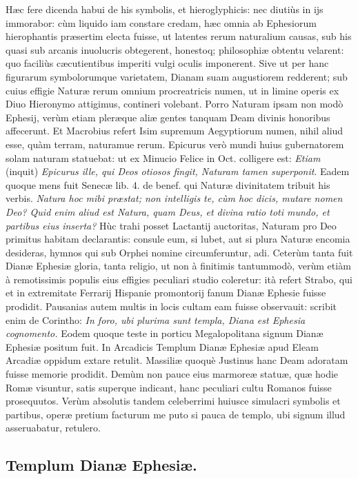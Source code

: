 \documentclass[a4paper, 11pt, oneside, polutonikogreek, latin]{article}
\begin{document}
Hæc fere dicenda habui de his symbolis, et hieroglyphicis: nec diutiùs in ijs immorabor: cùm liquido iam constare credam, hæc omnia ab Ephesiorum hierophantis præsertim electa fuisse, ut latentes rerum naturalium causas, sub his quasi sub arcanis inuolucris obtegerent, honestoq; philosophiæ obtentu velarent: quo faciliùs cæcutientibus imperiti vulgi oculis imponerent. Sive ut per hanc figurarum symbolorumque varietatem, Dianam suam augustiorem redderent; sub cuius effigie Naturæ rerum omnium procreatricis numen, ut in limine operis ex Diuo Hieronymo attigimus, contineri volebant. Porro Naturam ipsam non modò Ephesij, verùm etiam pleræque aliæ gentes tanquam Deam divinis honoribus affecerunt. Et Macrobius refert Isim supremum Aegyptiorum numen, nihil aliud esse, quàm terram, naturamue rerum. Epicurus verò mundi huius gubernatorem solam naturam statuebat: ut ex Minucio Felice in Oct. colligere est: \emph{Etiam} (inquit) \emph{Epicurus ille, qui Deos otiosos fingit, Naturam tamen superponit}. Eadem quoque mens fuit Senecæ lib. 4. de benef. qui Naturæ divinitatem tribuit his verbis. \emph{Natura hoc mibi præstat; non intelligis te, cùm hoc dicis, mutare nomen Deo? Quid enim aliud est Natura, quam Deus, et divina ratio toti mundo, et partibus eius inserta?} Hùc trahi posset Lactantij auctoritas, Naturam pro Deo primitus habitam declarantis: consule eum, si lubet, aut si plura Naturæ encomia desideras, hymnos qui sub Orphei nomine circumferuntur, adi. Ceterùm tanta fuit Dianæ Ephesiæ gloria, tanta religio, ut non à finitimis tantummodò, verùm etiàm à remotissimis populis eius effigies peculiari studio coleretur: ità refert Strabo, qui et in extremitate Ferrarij Hispanie promontorij fanum Dianæ Ephesie fuisse prodidit. Pausanias autem multis in locis cultam eam fuisse observauit: scribit enim de Corintho: \emph{In foro, ubi plurima sunt templa, Diana est Ephesia cognomento.} Eodem quoque teste in porticu Megalopolitana signum Dianæ Ephesiæ positum fuit. In Arcadicis Templum Dianæ Ephesiæ apud Eleam Arcadiæ oppidum extare retulit. Massiliæ quoquè Justinus hanc Deam adoratam fuisse memorie prodidit. Demùm non pauce eius marmoreæ statuæ, quæ hodie Romæ visuntur, satis superque indicant, hanc peculiari cultu Romanos fuisse prosequutos. Verùm absolutis tandem celeberrimi huiusce simulacri symbolis et partibus, operæ pretium facturum me puto si pauca de templo, ubi signum illud asseruabatur, retulero.
\clearpage
\subsection{Templum Dianæ Ephesiæ.}
\end{document}
